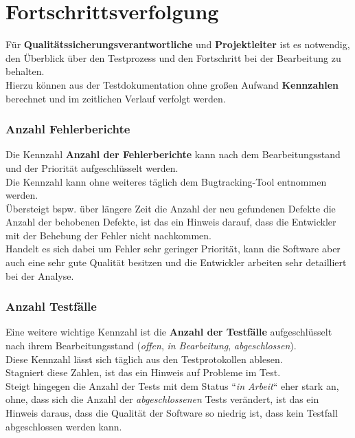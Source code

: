 \section{Fortschrittsverfolgung}
Für \textbf{Qualitätssicherungsverantwortliche} und \textbf{Projektleiter} ist es notwendig, den Überblick über den Testprozess und den Fortschritt bei der Bearbeitung zu behalten.\\
Hierzu können aus der Testdokumentation ohne großen Aufwand \textbf{Kennzahlen} berechnet und im zeitlichen Verlauf verfolgt werden.

\subsubsection*{Anzahl Fehlerberichte}
Die Kennzahl \textbf{Anzahl der Fehlerberichte} kann nach dem Bearbeitungsstand und der Priorität aufgeschlüsselt werden.\\
Die Kennzahl kann ohne weiteres täglich dem Bugtracking-Tool entnommen werden.\\
Übersteigt bspw. über längere Zeit die Anzahl der neu gefundenen Defekte die Anzahl der behobenen Defekte, ist das ein Hinweis darauf, dass die Entwickler mit der Behebung der Fehler nicht nachkommen.\\
Handelt es sich dabei um Fehler sehr geringer Priorität, kann die Software aber auch eine sehr gute Qualität besitzen und die Entwickler arbeiten sehr detailliert bei der Analyse.

\subsubsection*{Anzahl Testfälle}
Eine weitere wichtige Kennzahl ist die \textbf{Anzahl der Testfälle} aufgeschlüsselt nach ihrem Bearbeitungsstand (\textit{offen}, \textit{in Bearbeitung}, \textit{abgeschlossen}).\\
Diese Kennzahl lässt sich täglich aus den Testprotokollen ablesen.\\
Stagniert diese Zahlen, ist das ein Hinweis auf Probleme im Test.\\
Steigt hingegen die Anzahl der Tests mit dem Status ``\textit{in Arbeit}`` eher stark an, ohne, dass sich die Anzahl der \textit{abgeschlossenen} Tests verändert, ist das ein Hinweis daraus, dass die Qualität der Software so niedrig ist, dass kein Testfall abgeschlossen werden kann.